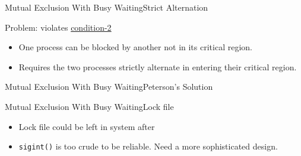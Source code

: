 \begin{frame}{Mutual Exclusion With Busy Waiting}{Strict Alternation}
  \begin{center}
  \end{center}
  \begin{block}{Problem: violates \hyperlink{cond}{condition-2}}
    \begin{itemize}
    \item One process can be blocked by another not in its critical region.
    \item Requires the two processes strictly alternate in entering their critical region.
    \end{itemize}
  \end{block}
\end{frame}

\begin{frame}{Mutual Exclusion With Busy Waiting}{Peterson's Solution}
  \begin{center}
  \end{center}
  \begin{refsection}
    \nocite{wiki:peterson}
    \printbibliography[heading=none]
  \end{refsection}
\end{frame}

\begin{frame}{Mutual Exclusion With Busy Waiting}{Lock file}
  \begin{itemize}
  \item[\Bad] Lock file could be left in system after \Cc
  \end{itemize}
\end{frame}

\begin{frame}
  \begin{itemize}
  \item[\Bad] \texttt{sigint()} is too crude to be reliable. Need a more sophisticated design.
  \end{itemize}
\end{frame}

